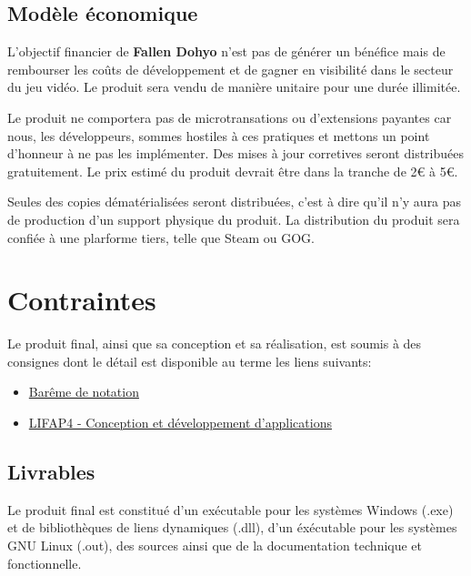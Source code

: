 \documentclass[french]{report}
\newcommand{\gamename}{\textbf{Fallen Dohyo} }
\begin{document}
\section{Modèle économique}

    L'objectif financier de \gamename n'est pas de générer un bénéfice
    mais de rembourser les coûts de développement
    et de gagner en visibilité dans le secteur du jeu vidéo.
    Le produit sera vendu de manière unitaire pour une durée illimitée.

    Le produit ne comportera pas de microtransations ou d'extensions payantes
    car nous, les développeurs, sommes hostiles à ces pratiques
    et mettons un point d'honneur à ne pas les implémenter.
    Des mises à jour corretives seront distribuées gratuitement.
    Le prix estimé du produit devrait être dans la tranche de 2€ à 5€.
    
    Seules des copies dématérialisées seront distribuées,
    c'est à dire qu'il n'y aura pas de production d'un support physique du produit.
    La distribution du produit sera confiée à une plarforme tiers,
    telle que Steam ou GOG.

\chapter{Contraintes}\label{ch:contraintes}

    Le produit final, ainsi que sa conception et sa réalisation,
    est soumis à des consignes dont le détail est disponible
    au terme les liens suivants:
    \begin{itemize}[label=$\bullet$]
        \item \href{https://docs.google.com/spreadsheets/d/1OcpRm6gQtmRNWSXeG7QwnFJ6Eqzl7_DKCjUM4V9P4A0/edit#gid=1}
        {Barême de notation}
        \item \href{https://perso.liris.cnrs.fr/alexandre.meyer/public_html/www/doku.php?id=lifap4}
        {LIFAP4 - Conception et développement d'applications}
    \end{itemize}

\section{Livrables}

    Le produit final est constitué
    d'un exécutable pour les systèmes Windows (.exe)
    et de bibliothèques de liens dynamiques (.dll),
    d'un éxécutable pour les systèmes GNU Linux (.out),
    des sources
    ainsi que de la documentation technique et fonctionnelle.
\end{document}
